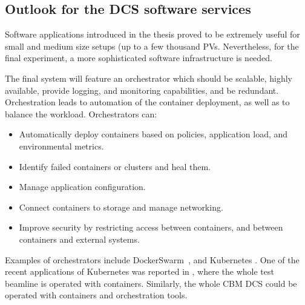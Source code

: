 \subsection{Outlook for the DCS software services} 
Software applications introduced in the thesis proved to be extremely useful for small and medium size setups (up to a few thousand \glspl{PV}. Nevertheless, for the final experiment, a more sophisticated software infrastructure is needed.

The final system will feature an orchestrator which should be scalable, highly available, provide logging, and monitoring capabilities, and be redundant. Orchestration leads to automation of the container deployment, as well as to balance the workload. Orchestrators can:
 \begin{itemize}
     \item Automatically deploy containers based on policies, application load, and environmental metrics.
     \item Identify failed containers or clusters and heal them.
     \item Manage application configuration.
     \item Connect containers to storage and manage networking.
     \item Improve security by restricting access between containers, and between containers and external systems.
 \end{itemize}

 Examples of orchestrators include DockerSwarm~\cite{DockerSwarm}, and Kubernetes \cite{Kubernetes}. One of the recent applications of Kubernetes was reported in \cite{ICALEPCS2021:Diamond}, where the whole test beamline is operated with containers. Similarly, the whole \gls{CBM} \gls{DCS} could be operated with containers and orchestration tools. 

